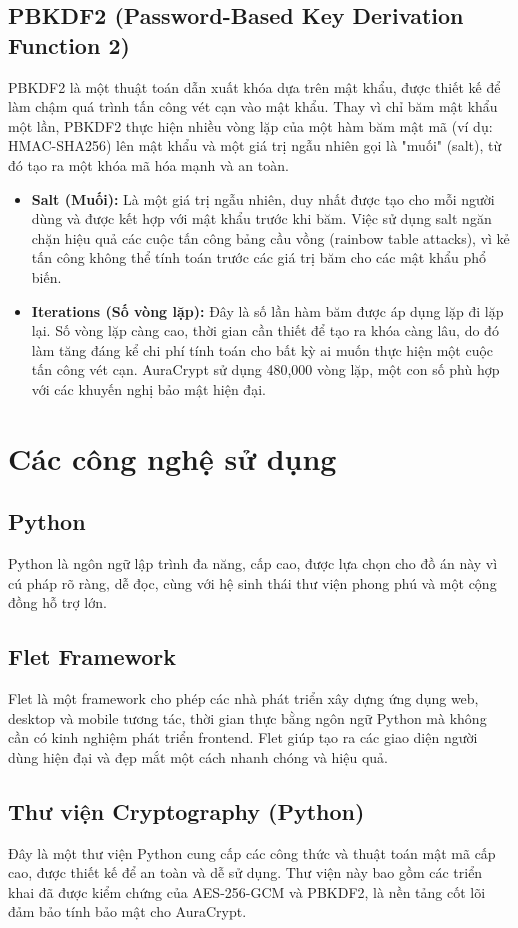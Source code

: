 \subsection{PBKDF2 (Password-Based Key Derivation Function 2)}
PBKDF2 là một thuật toán dẫn xuất khóa dựa trên mật khẩu, được thiết kế để làm chậm quá trình tấn công vét cạn vào mật khẩu. Thay vì chỉ băm mật khẩu một lần, PBKDF2 thực hiện nhiều vòng lặp của một hàm băm mật mã (ví dụ: HMAC-SHA256) lên mật khẩu và một giá trị ngẫu nhiên gọi là "muối" (salt), từ đó tạo ra một khóa mã hóa mạnh và an toàn.
\begin{itemize}
    \item \textbf{Salt (Muối):} Là một giá trị ngẫu nhiên, duy nhất được tạo cho mỗi người dùng và được kết hợp với mật khẩu trước khi băm. Việc sử dụng salt ngăn chặn hiệu quả các cuộc tấn công bảng cầu vồng (rainbow table attacks), vì kẻ tấn công không thể tính toán trước các giá trị băm cho các mật khẩu phổ biến.
    \item \textbf{Iterations (Số vòng lặp):} Đây là số lần hàm băm được áp dụng lặp đi lặp lại. Số vòng lặp càng cao, thời gian cần thiết để tạo ra khóa càng lâu, do đó làm tăng đáng kể chi phí tính toán cho bất kỳ ai muốn thực hiện một cuộc tấn công vét cạn. AuraCrypt sử dụng 480,000 vòng lặp, một con số phù hợp với các khuyến nghị bảo mật hiện đại.
\end{itemize}

\section{Các công nghệ sử dụng}
\subsection{Python}
Python là ngôn ngữ lập trình đa năng, cấp cao, được lựa chọn cho đồ án này vì cú pháp rõ ràng, dễ đọc, cùng với hệ sinh thái thư viện phong phú và một cộng đồng hỗ trợ lớn.
\subsection{Flet Framework}
Flet là một framework cho phép các nhà phát triển xây dựng ứng dụng web, desktop và mobile tương tác, thời gian thực bằng ngôn ngữ Python mà không cần có kinh nghiệm phát triển frontend. Flet giúp tạo ra các giao diện người dùng hiện đại và đẹp mắt một cách nhanh chóng và hiệu quả.
\subsection{Thư viện Cryptography (Python)}
Đây là một thư viện Python cung cấp các công thức và thuật toán mật mã cấp cao, được thiết kế để an toàn và dễ sử dụng. Thư viện này bao gồm các triển khai đã được kiểm chứng của AES-256-GCM và PBKDF2, là nền tảng cốt lõi đảm bảo tính bảo mật cho AuraCrypt.
